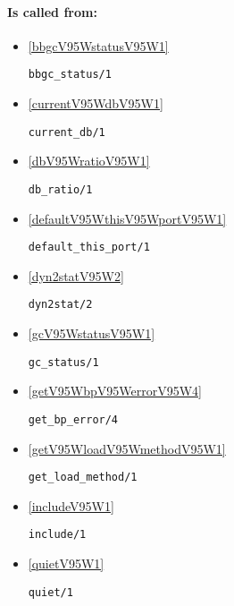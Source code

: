\paragraph{Is called from:} 
\begin{itemize}
\item \ref{bbgcV95WstatusV95W1} 
\begin{verbatim}
bbgc_status/1
\end{verbatim}

\item \ref{currentV95WdbV95W1} 
\begin{verbatim}
current_db/1
\end{verbatim}

\item \ref{dbV95WratioV95W1} 
\begin{verbatim}
db_ratio/1
\end{verbatim}

\item \ref{defaultV95WthisV95WportV95W1} 
\begin{verbatim}
default_this_port/1
\end{verbatim}

\item \ref{dyn2statV95W2} 
\begin{verbatim}
dyn2stat/2
\end{verbatim}

\item \ref{gcV95WstatusV95W1} 
\begin{verbatim}
gc_status/1
\end{verbatim}

\item \ref{getV95WbpV95WerrorV95W4} 
\begin{verbatim}
get_bp_error/4
\end{verbatim}

\item \ref{getV95WloadV95WmethodV95W1} 
\begin{verbatim}
get_load_method/1
\end{verbatim}

\item \ref{includeV95W1} 
\begin{verbatim}
include/1
\end{verbatim}

\item \ref{quietV95W1} 
\begin{verbatim}
quiet/1
\end{verbatim}

\end{itemize}

